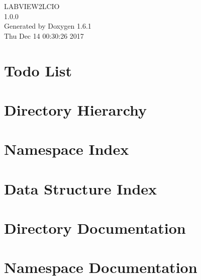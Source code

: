 \documentclass[a4paper]{book}
\begin{document}
\begin{titlepage}
\vspace*{7cm}
\begin{center}
{\Large LABVIEW2LCIO \\[1ex]\large 1.0.0 }\\
\vspace*{1cm}
{\large Generated by Doxygen 1.6.1}\\
\vspace*{0.5cm}
{\small Thu Dec 14 00:30:26 2017}\\
\end{center}
\end{titlepage}
\clearemptydoublepage
{}
\tableofcontents
\clearemptydoublepage
{}
\chapter{Todo List}
\label{todo}

\chapter{Directory Hierarchy}

\chapter{Namespace Index}

\chapter{Data Structure Index}

\chapter{Directory Documentation}




\chapter{Namespace Documentation}

\end{document}
